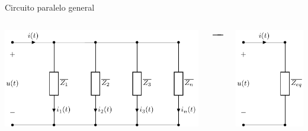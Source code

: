 \documentclass[aspectratio=169, usenames,svgnames,dvipsnames]{beamer}
\begin{document}
\begin{frame}[label={sec:org5b9120d}]{Circuito paralelo general}
\begin{columns}
\begin{column}{0.6\columnwidth}
\begin{center}
\begin{center}
\includegraphics[width=.9\linewidth]{../figs/paralelo_general.pdf}
\end{center}
\end{center}
\end{column}
\begin{column}{0.1\columnwidth}
\begin{center}
\(\LARGE \xrightarrow{\hspace*{0.5cm}}\)
\end{center}
\end{column}
\begin{column}{0.2\columnwidth}
\begin{center}
\begin{center}
\includegraphics[width=.9\linewidth]{../figs/paralelo_general_eq.pdf}

\end{center}
\end{center}
\end{column}
\end{columns}
\end{frame}
\end{document}
